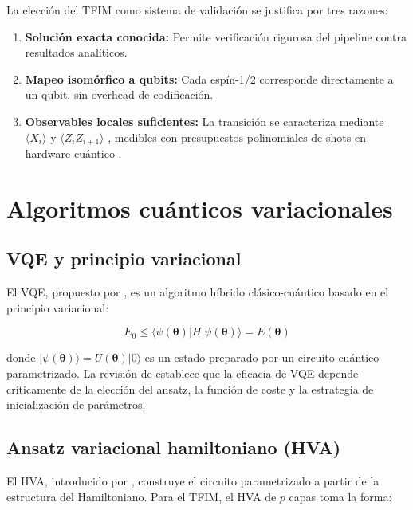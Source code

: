 \documentclass[11pt,a4paper,spanish]{book}
\begin{document}
La elección del TFIM como sistema de validación se justifica por tres razones:

\begin{enumerate}
    \item \textbf{Solución exacta conocida:} Permite verificación rigurosa del pipeline contra resultados analíticos.
    \item \textbf{Mapeo isomórfico a qubits:} Cada espín-1/2 corresponde directamente a un qubit, sin overhead de codificación.
    \item \textbf{Observables locales suficientes:} La transición se caracteriza mediante $\langle X_i \rangle$ y $\langle Z_i Z_{i+1} \rangle$ \citep{dutta2015}, medibles con presupuestos polinomiales de shots en hardware cuántico \citep{cerezo2021}.
\end{enumerate}

\section{Algoritmos cuánticos variacionales}

\subsection{VQE y principio variacional}

El VQE, propuesto por \citet{peruzzo2014}, es un algoritmo híbrido clásico-cuántico basado en el principio variacional:

\begin{equation}
E_0 \leq \langle \psi(\boldsymbol{\theta}) | H | \psi(\boldsymbol{\theta}) \rangle = E(\boldsymbol{\theta})
\label{eq:variational}
\end{equation}

\noindent donde $|\psi(\boldsymbol{\theta})\rangle = U(\boldsymbol{\theta})|0\rangle$ es un estado preparado por un circuito cuántico parametrizado. La revisión de \citet{tilly2022} establece que la eficacia de VQE depende críticamente de la elección del ansatz, la función de coste y la estrategia de inicialización de parámetros.

\subsection{Ansatz variacional hamiltoniano (HVA)}

El HVA, introducido por \citet{wiersema2020}, construye el circuito parametrizado a partir de la estructura del Hamiltoniano. Para el TFIM, el HVA de $p$ capas toma la forma:
\end{document}
